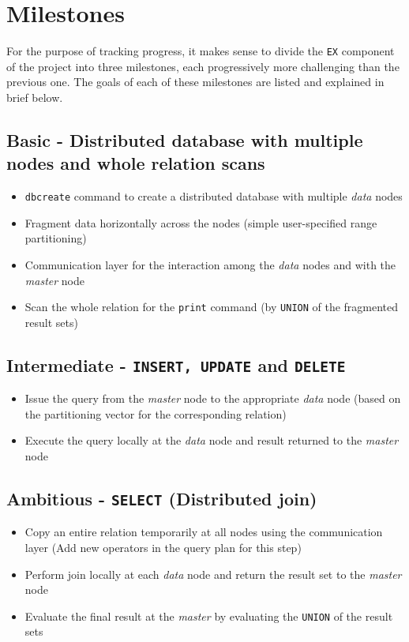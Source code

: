 \documentclass[letterpaper,11pt]{article}
\begin{document}

\section{Milestones}
For the purpose of tracking progress, it makes sense to divide the \texttt{EX} component of the project
into three milestones, each progressively more challenging than the previous one. The goals of each of
these milestones are listed and explained in brief below.

\subsection{Basic - Distributed database with multiple nodes and whole relation scans}
\begin{itemize}
\item \texttt{dbcreate} command to create a distributed database with multiple \textit{data} nodes
\item Fragment data horizontally across the nodes (simple user-specified range partitioning)
\item Communication layer for the interaction among the \textit{data} nodes and with the
\textit{master} node
\item Scan the whole relation for the \texttt{print} command (by \texttt{UNION} of the fragmented
result sets)
\end{itemize}

\subsection{Intermediate - \texttt{INSERT, UPDATE} and \texttt{DELETE}}
\begin{itemize}
\item Issue the query from the \textit{master} node to the appropriate \textit{data} node (based on
the partitioning vector for the corresponding relation)
\item Execute the query locally at the \textit{data} node and result returned to the \textit{master}
node
\end{itemize}

\subsection{Ambitious - \texttt{SELECT} (Distributed join)}
\begin{itemize}
\item Copy an entire relation temporarily at all nodes using the communication layer (Add new
operators in the query plan for this step)
\item Perform join locally at each \textit{data} node and return the result set to the \textit{master}
node
\item Evaluate the final result at the \textit{master} by evaluating the \texttt{UNION} of the result
sets
\end{itemize}
\end{document}
